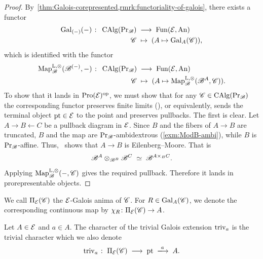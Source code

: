 \documentclass[english,svgnames,table]{article}
\begin{document}
    \begin{proof}
        By~\cref{thm:Galois-corepresented,rmrk:functoriality-of-galois}, there exists a functor
        \begin{equation*}
            \begin{split}
                \mathrm{Gal}_{(-)}(-) \;\colon\; \operatorname{CAlg}(\operatorname{Pr}_{\mathscr{B}}) & \;\longrightarrow\; \operatorname{Fun}(\mathcal{E}, \mathrm{An}) \\
                \mathscr{C} & \;\mapsto\; (A \mapsto \mathrm{Gal}_A(\mathscr{C})),
            \end{split}
        \end{equation*}
        which is identified with the functor
        \begin{equation*}
            \begin{split}
                \operatorname{Map}^{\mathrm{L},\otimes}_{\mathscr{B}}(\mathscr{B}^{(-)}, -) \;\colon\; \operatorname{CAlg}(\operatorname{Pr}_{\mathscr{B}}) & \;\longrightarrow\; \operatorname{Fun}(\mathcal{E}, \mathrm{An}) \\
                \mathscr{C} & \;\mapsto\; (A \mapsto \operatorname{Map}^{\mathrm{L},\otimes}_{\mathscr{B}}(\mathscr{B}^A, \mathscr{C})).
            \end{split}
        \end{equation*}
        To show that it lands in $\operatorname{Pro}(\mathcal{E})^{\mathrm{op}}$, we must show that for any $\mathscr{C} \in \operatorname{CAlg}(\operatorname{Pr}_{\mathscr{B}})$ the corresponding functor preserves finite limits (\cite[Corollary~5.3.5.4]{Lurie-HTT}), or equivalently, sends the terminal object $\mathrm{pt} \in \mathcal{E}$ to the point and preserves pullbacks. The first is clear. Let $A \to B \leftarrow C$ be a pullback diagram in $\mathcal{E}$. Since $B$ and the fibers of $A \to B$ are truncated, $B$ and the map are $\operatorname{Pr}_{\mathscr{B}}$-ambidextrous (\cref{exm:ModB-ambi}), while $B$ is $\operatorname{Pr}_{\mathscr{B}}$-affine. Thus,~\cite[Theorem~2.38]{BCSY-Fourier} shows that $A \to B$ is Eilenberg--Moore. That is
        \begin{equation*}
            \mathscr{B}^A \otimes_{\mathscr{B}^B} \mathscr{B}^C \;\simeq\; \mathscr{B}^{A \times_B C}.
        \end{equation*}
        Applying $\operatorname{Map}^{\mathrm{L},\otimes}_{\mathscr{B}}(-,\mathscr{C})$ gives the required pullback.
        Therefore it lands in prorepresentable objects.
    \end{proof}
    
    \begin{notation}
        We call $\Pi_{\mathcal{E}}(\mathscr{C})$ the $\mathcal{E}$-Galois anima of $\mathscr{C}$.
        For $R \in \mathrm{Gal}_A(\mathscr{C})$, we denote the corresponding continuous map by $\chi_R \colon \Pi_{\mathcal{E}}(\mathscr{C}) \to A$.
    \end{notation}
        
    \begin{example}
        Let $A \in \mathcal{E}$ and $a \in A$. The character of the trivial Galois extension $\mathrm{triv}_a$ is the trivial character which we also denote
        \begin{equation*}
            \triv_a \;\colon\; \piT(\cC) \;\too\; \pt \;\xtoo{a}\; A.
        \end{equation*}
    \end{example}
    
\end{document}
